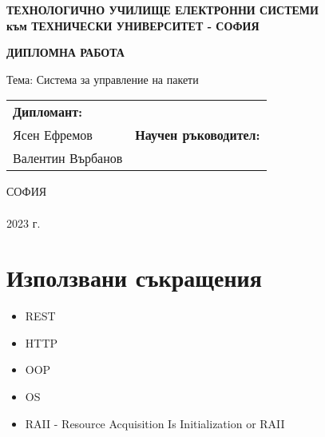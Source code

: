 \documentclass[14pt]{extreport}
\begin{document}
\begin{titlepage}
    \begin{center}
        \textbf{
            ТЕХНОЛОГИЧНО УЧИЛИЩЕ ЕЛЕКТРОННИ СИСТЕМИ \\
            към ТЕХНИЧЕСКИ УНИВЕРСИТЕТ - СОФИЯ
        }
    
        \vspace{5cm}
        \textbf{\huge ДИПЛОМНА РАБОТА}
    
        \vspace{20mm}
        {\Large Тема:
            Система за управление на пакети
        }
    
        \vspace{35mm}
        \begin{tabular}{p{8cm}p{8cm}}
            \centering
            \textbf{Дипломант:} \\
            Ясен Ефремов
            &
            \centering
            \textbf{Научен ръководител:} \\
            Валентин Върбанов
        \end{tabular}
    
        \vfill
        СОФИЯ \\
        \hfill \\
        2023 г.
    \end{center}
\end{titlepage}

\chapter*{Използвани съкращения}

\begin{itemize}
    \item REST
    \item HTTP
    \item OOP
    \item OS
    \item RAII - Resource Acquisition Is Initialization or RAII
\end{itemize}









\printbibliography

\tableofcontents
\end{document}
